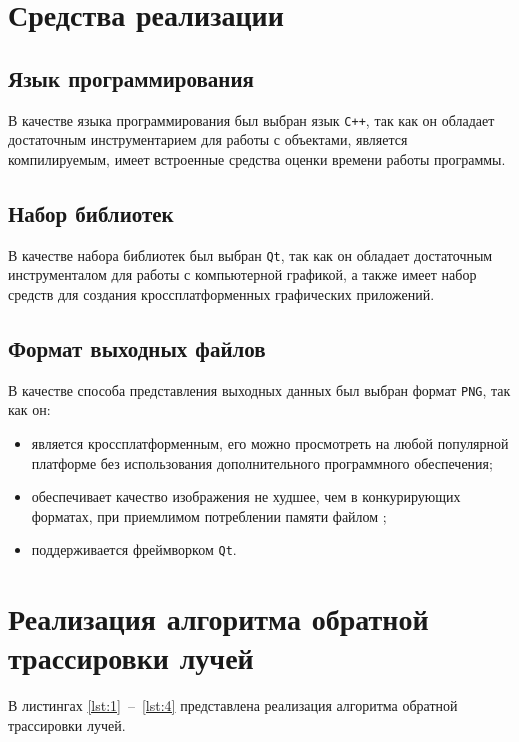 \section{Средства реализации}

\subsection{Язык программирования}

В качестве языка программирования был выбран язык \texttt{C++}, так как он обладает достаточным инструментарием для работы с объектами, является компилируемым, имеет встроенные средства оценки времени работы программы.


\subsection{Набор библиотек}

В качестве набора библиотек был выбран \texttt{Qt}, так как он обладает достаточным инструменталом для работы с компьютерной графикой, а также имеет набор средств для создания кроссплатформенных графических приложений.

\subsection{Формат выходных файлов}
В качестве способа представления выходных данных был выбран формат \texttt{PNG}, так как он:

\begin{itemize}
	\item является кроссплатформенным, его можно просмотреть на любой популярной платформе без использования дополнительного программного обеспечения;
	\item обеспечивает качество изображения не худшее, чем в конкурирующих форматах, при приемлимом потреблении памяти файлом \cite{bib:14};
	\item поддерживается фреймворком \texttt{Qt}.
\end{itemize}

\section{Реализация алгоритма обратной трассировки лучей}

В листингах \ref{lst:1}~--~\ref{lst:4} представлена реализация алгоритма обратной трассировки лучей. 

